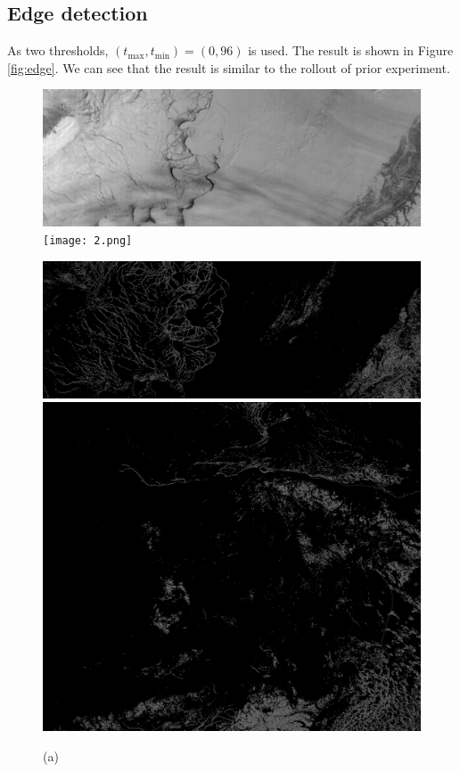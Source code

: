 \documentclass{article}
\begin{document}
    \subsection{Edge detection} \label{sec:edge}
        As two thresholds, $(t_\mathrm{max}, t_\mathrm{min}) = (0, 96)$ is used.
        The result is shown in Figure \ref{fig:edge}.
        We can see that the result is similar to the rollout of prior experiment.

        \begin{figure}[ht]
            \centering
            \begin{minipage}{0.49\hsize}
                \centering
                \includegraphics[width = 1\hsize]{1.png}
                \texttt{[image: 2.png]}
                \caption*{(a)}
            \end{minipage}
            \begin{minipage}{0.49\hsize}
                \centering
                \includegraphics[width = 1\hsize]{1_edge.png}
                \includegraphics[width = 1\hsize]{2_edge.png}

\end{minipage}
\end{figure}
\end{document}
